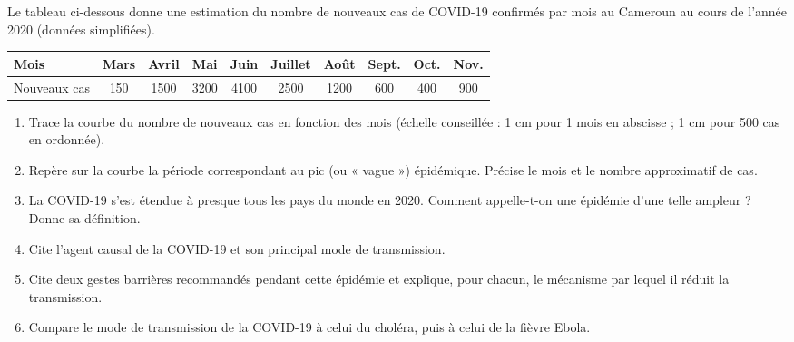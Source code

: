 \documentclass[11pt]{article}
\begin{document}
\begin{exercice}
Le tableau ci-dessous donne une estimation du nombre de nouveaux cas de COVID-19 confirmés par mois au Cameroun au cours de l'année 2020 (données simplifiées).

\begin{center}
\begin{tabular}{|l|c|c|c|c|c|c|c|c|c|}
\hline
\rowcolor{popblueL} Mois & Mars & Avril & Mai & Juin & Juillet & Août & Sept. & Oct. & Nov. \\
\hline
Nouveaux cas & 150 & \num{1500} & \num{3200} & \num{4100} & \num{2500} & \num{1200} & 600 & 400 & 900 \\
\hline
\end{tabular}
\end{center}

\begin{enumerate}
\item Trace la courbe du nombre de nouveaux cas en fonction des mois (échelle conseillée : 1 cm pour 1 mois en abscisse ; 1 cm pour 500 cas en ordonnée).
\item Repère sur la courbe la période correspondant au pic (ou « vague ») épidémique. Précise le mois et le nombre approximatif de cas.
\item La COVID-19 s'est étendue à presque tous les pays du monde en 2020. Comment appelle-t-on une épidémie d'une telle ampleur ? Donne sa définition.
\item Cite l'agent causal de la COVID-19 et son principal mode de transmission.
\item Cite deux gestes barrières recommandés pendant cette épidémie et explique, pour chacun, le mécanisme par lequel il réduit la transmission.
\item Compare le mode de transmission de la COVID-19 à celui du choléra, puis à celui de la fièvre Ebola.
\end{enumerate}
\end{exercice}
\end{document}
